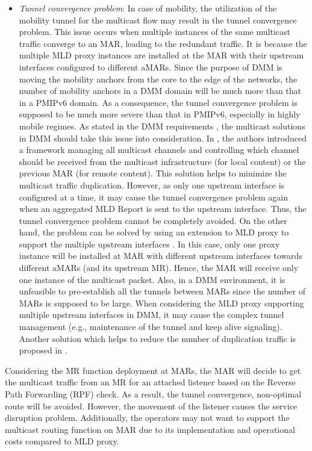 \begin{itemize}
\item \textit{Tunnel convergence problem}: In case of mobility, the utilization of the mobility tunnel for the multicast flow may result in the tunnel convergence problem. This issue occurs when multiple instances of the same multicast traffic converge to an MAR, leading to the redundant traffic. It is because the multiple MLD proxy instances are installed at the MAR with their upstream interfaces configured to different aMARs. Since the purpose of DMM is moving the mobility anchors from the core to the edge of the networks, the number of mobility anchors in a DMM domain will be much more than that in a PMIPv6 domain. As a consequence, the tunnel convergence problem is supposed to be much more severe than that in PMIPv6, especially in highly mobile regimes. As stated in the DMM requirements \cite{DMM_requirements}, the multicast solutions in DMM should take this issue into consideration. In \cite{Channel_manageable_Seil}, the authors introduced a framework managing all multicast channels and controlling which channel should be received from the multicast infrastructure (for local content) or the previous MAR (for remote content). This solution helps to minimize the multicast traffic duplication. However, as only one upstream interface is configured at a time, it may cause the tunnel convergence problem again when an aggregated MLD Report is sent to the upstream interface. Thus, the tunnel convergence problem cannot be completely avoided. On the other hand, the problem can be solved by using an extension to MLD proxy to support the multiple upstream interfaces \cite{multi_upstream_interface}. In this case, only one proxy instance will be installed at MAR with different upstream interfaces towards different aMARs (and its upstream MR). Hence, the MAR will receive only one instance of the multicast packet. Also, in a DMM environment, it is unfeasible to pre-establish all the tunnels between MARs since the number of MARs is supposed to be large. When considering the MLD proxy supporting multiple upstream interfaces in DMM, it may cause the complex tunnel management (e.g., maintenance of the tunnel and keep alive signaling). Another solution which helps to reduce the number of duplication traffic is proposed in \cite{Thinh_ICNS}.
\end{itemize}

Considering the MR function deployment at MARs, the MAR will decide to get the multicast traffic from an MR for an attached listener based on the Reverse Path Forwarding (RPF) check. As a result, the tunnel convergence, non-optimal route will be avoided. However, the movement of the listener causes the service disruption problem. Additionally, the operators may not want to support the multicast routing function on MAR due to its implementation and operational costs compared to MLD proxy.

